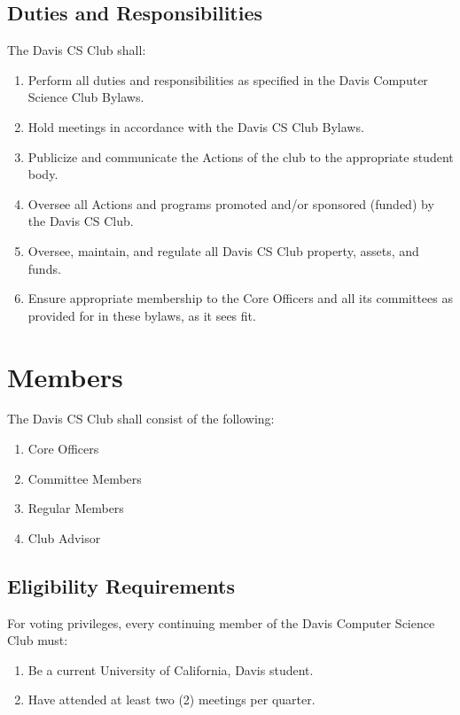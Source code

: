 \documentclass{article}
\newenvironment{li}{
\begin{enumerate}
  \setlength{\itemsep}{1pt}
  \setlength{\parskip}{0pt}
  \setlength{\parsep}{0pt}
}{\end{enumerate}}
\begin{document}
\subsection{Duties and Responsibilities}
The Davis CS Club shall:
\begin{li}
\item Perform all duties and responsibilities as specified in the Davis Computer Science Club Bylaws.
\item Hold meetings in accordance with the Davis CS Club Bylaws.
\item Publicize and communicate the Actions of the club to the appropriate student body.
\item Oversee all Actions and programs promoted and/or sponsored (funded) by the Davis CS Club.
\item Oversee, maintain, and regulate all Davis CS Club property, assets, and funds.
\item Ensure appropriate membership to the Core Officers and all its committees as provided for in these bylaws, as it sees fit.
\end{li}


\section{Members}
The Davis CS Club shall consist of the following:
\begin{li}
\item Core Officers
\item Committee Members
\item Regular Members
\item Club Advisor
\end{li}

\subsection{Eligibility Requirements}
For voting privileges, every continuing member of the Davis Computer Science Club must:
\begin{li}
\item Be a current University of California, Davis student.
\item Have attended at least two (2) meetings per quarter.
\end{li}
\end{document}
